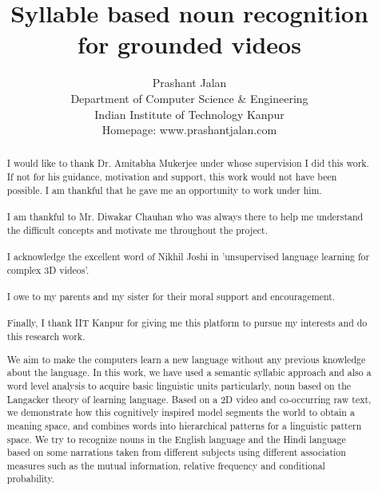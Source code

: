 \documentclass[12pt, a4paper]{report}
\begin{document}
\title{Syllable based noun recognition\\for grounded videos}
\author{Prashant Jalan
\\Department of Computer Science \& Engineering\\
Indian Institute of Technology Kanpur\\
Homepage: www.prashantjalan.com}

\maketitle
\tableofcontents

\renewcommand{\abstractname}{Acknowledgements}
\begin{abstract}
I would like to thank Dr. Amitabha Mukerjee under whose supervision I did this work. If not for his guidance, motivation and support, this work would not have been possible. I am thankful that he gave me an opportunity to work under him.\\
\\
I am thankful to Mr. Diwakar Chauhan who was always there to help me understand the difficult concepts and motivate me throughout the project.\\
\\
I acknowledge the excellent word of Nikhil Joshi\cite{nikhil} in 'unsupervised language learning for complex 3D videos'.\\
\\
I owe to my parents and my sister for their moral support and encouragement.\\
\\
Finally, I thank IIT Kanpur for giving me this platform to pursue my interests and do this research work.



\end{abstract}

\renewcommand{\abstractname}{Abstract}
\begin{abstract}
We aim to make the computers learn a new language without any previous knowledge about the language. In this work, we have used a semantic syllabic approach and also a word level analysis to acquire basic linguistic units particularly, noun based on the Langacker\cite{langacker} theory of learning language. Based on a 2D video and co-occurring raw text, we demonstrate how this cognitively inspired model segments the world to obtain a meaning space, and combines words into hierarchical patterns for a linguistic pattern space. We try to recognize nouns in the English language and the Hindi language based on some narrations taken from different subjects using different association measures such as the mutual information, relative frequency and conditional probability.
\end{abstract}
\end{document}
